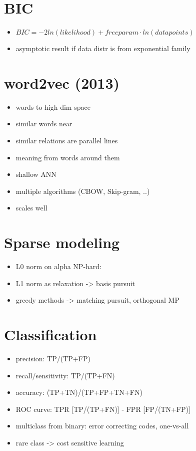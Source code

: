 \documentclass{article}
\begin{document}
\begin{multicols}{3}
\section{BIC}
\begin{itemize}
\item $BIC=-2 ln(likelihood)+ freeparam\cdot ln(datapoints)$
\item asymptotic result if data distr is from exponential family
\end{itemize}

\section{word2vec (2013)}
\begin{itemize}
\item words to high dim space
\item similar words near
\item similar relations are parallel lines
\item meaning from words around them
\item shallow ANN
\item multiple algorithms (CBOW, Skip-gram, ..)
\item scales well
\end{itemize}

\section{Sparse modeling}
\begin{itemize}
\item L0 norm on alpha NP-hard:
\item L1 norm as relaxation -> basis pursuit
\item greedy methods -> matching pursuit, orthogonal MP
\end{itemize}

\section{Classification}
\begin{itemize}
\item precision: TP/(TP+FP)
\item recall/sensitivity: TP/(TP+FN)
\item accuracy: (TP+TN)/(TP+FP+TN+FN)
\item ROC curve: TPR [TP/(TP+FN)] - FPR [FP/(TN+FP)]
\item multiclass from binary: error correcting codes, one-vs-all
\item rare class -> cost sensitive learning
\end{itemize}


\end{multicols}
\end{document}
